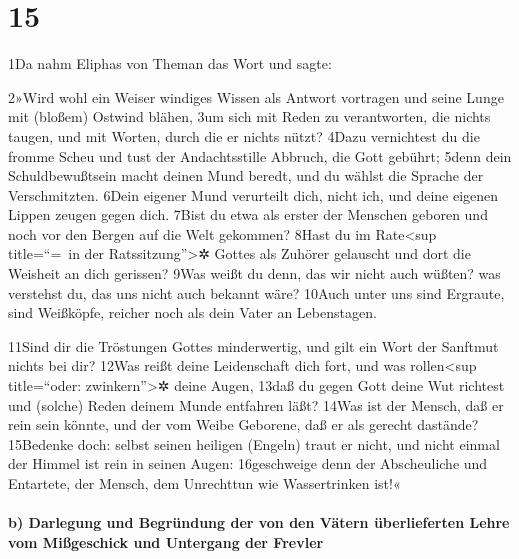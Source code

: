 \hypertarget{section-14}{%
\section{15}\label{section-14}}

1Da nahm Eliphas von Theman das Wort und sagte:

2»Wird wohl ein Weiser windiges Wissen als Antwort vortragen und seine
Lunge mit (bloßem) Ostwind blähen, 3um sich mit Reden zu verantworten,
die nichts taugen, und mit Worten, durch die er nichts nützt? 4Dazu
vernichtest du die fromme Scheu und tust der Andachtsstille Abbruch, die
Gott gebührt; 5denn dein Schuldbewußtsein macht deinen Mund beredt, und
du wählst die Sprache der Verschmitzten. 6Dein eigener Mund verurteilt
dich, nicht ich, und deine eigenen Lippen zeugen gegen dich. 7Bist du
etwa als erster der Menschen geboren und noch vor den Bergen auf die
Welt gekommen? 8Hast du im Rate\textless sup title=``=~in der
Ratssitzung''\textgreater✲ Gottes als Zuhörer gelauscht und dort die
Weisheit an dich gerissen? 9Was weißt du denn, das wir nicht auch
wüßten? was verstehst du, das uns nicht auch bekannt wäre? 10Auch unter
uns sind Ergraute, sind Weißköpfe, reicher noch als dein Vater an
Lebenstagen.

11Sind dir die Tröstungen Gottes minderwertig, und gilt ein Wort der
Sanftmut nichts bei dir? 12Was reißt deine Leidenschaft dich fort, und
was rollen\textless sup title=``oder: zwinkern''\textgreater✲ deine
Augen, 13daß du gegen Gott deine Wut richtest und (solche) Reden deinem
Munde entfahren läßt? 14Was ist der Mensch, daß er rein sein könnte, und
der vom Weibe Geborene, daß er als gerecht dastände? 15Bedenke doch:
selbst seinen heiligen (Engeln) traut er nicht, und nicht einmal der
Himmel ist rein in seinen Augen: 16geschweige denn der Abscheuliche und
Entartete, der Mensch, dem Unrechttun wie Wassertrinken ist!«

\hypertarget{b-darlegung-und-begruxfcndung-der-von-den-vuxe4tern-uxfcberlieferten-lehre-vom-miuxdfgeschick-und-untergang-der-frevler}{%
\paragraph{b) Darlegung und Begründung der von den Vätern überlieferten
Lehre vom Mißgeschick und Untergang der
Frevler}\label{b-darlegung-und-begruxfcndung-der-von-den-vuxe4tern-uxfcberlieferten-lehre-vom-miuxdfgeschick-und-untergang-der-frevler}}

